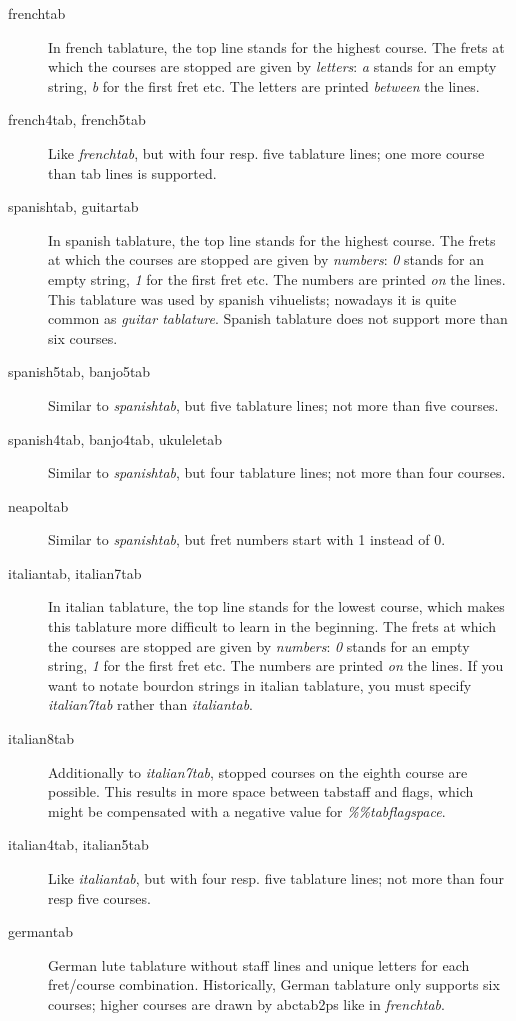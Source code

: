 \documentclass[a4paper]{article}
\begin{document}
\begin{description}
\item[frenchtab] In french tablature, the top line stands for the
highest course. The frets at which the courses are stopped are given
by {\it letters}: {\it a} stands for an empty string, {\it b} for the first
fret etc. The letters are printed {\it between} the lines.

\item[french4tab, french5tab] Like {\it frenchtab}, but with four resp.
five tablature lines; one more course than tab lines is supported.

\item[spanishtab, guitartab] In spanish tablature, the top line stands for the
highest course. The frets at which the courses are stopped are given
by {\it numbers}: {\it 0} stands for an empty string, {\it 1} for the first
fret etc. The numbers are printed {\it on} the lines. This tablature 
was used by spanish vihuelists; nowadays it
is quite common as {\it guitar tablature}. Spanish tablature does not
support more than six courses.

\item[spanish5tab, banjo5tab] Similar to {\it spanishtab}, but five tablature
lines; not more than five courses.

\item[spanish4tab, banjo4tab, ukuleletab] Similar to {\it spanishtab}, but 
four tablature lines; not more than four courses.

\item[neapoltab] Similar to {\it spanishtab}, but fret numbers start with 1
instead of 0.

\item[italiantab, italian7tab] In italian tablature, the top line stands 
for the lowest course, which makes this tablature more difficult to learn 
in the beginning. The frets at which the courses are stopped are given
by {\it numbers}: {\it 0} stands for an empty string, {\it 1} for the first
fret etc. The numbers are printed {\it on} the lines. If you want
to notate bourdon strings in italian tablature, you must specify
{\it italian7tab} rather than {\it italiantab}.

\item[italian8tab] Additionally to {\it italian7tab}, stopped courses on
the eighth course are possible. This results in more space between
tabstaff and flags, which might be compensated with a negative value
for {\it \%\%tabflagspace}.

\item[italian4tab, italian5tab] Like {\it italiantab}, but with four resp.
five tablature lines; not more than four resp five courses.

\item[germantab] German lute tablature without staff lines and unique
  letters for each fret/course combination. Historically, German tablature
  only supports six courses; higher courses are drawn by abctab2ps like
  in {\em frenchtab}.

\end{description}
\end{document}
